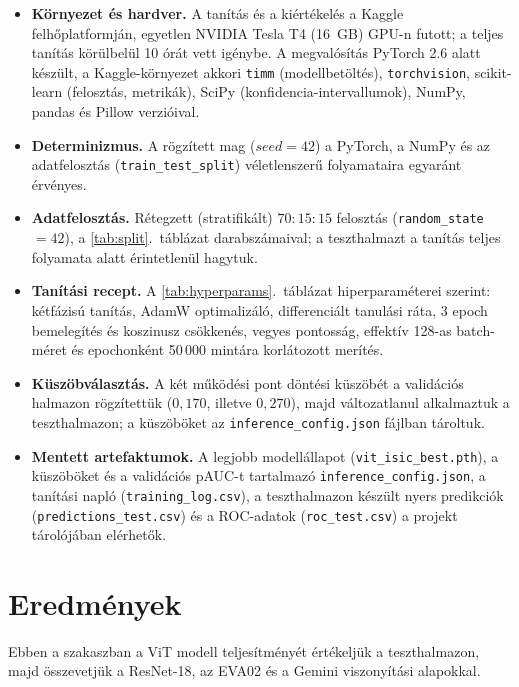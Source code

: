 \begin{itemize}
  \item \textbf{Környezet és hardver.} A tanítás és a kiértékelés a Kaggle
  felhőplatformján, egyetlen NVIDIA Tesla T4 (16~GB) GPU-n futott; a teljes
  tanítás körülbelül 10 órát vett igénybe. A megvalósítás PyTorch 2.6 alatt
  készült, a Kaggle-környezet akkori \texttt{timm} (modellbetöltés),
  \texttt{torchvision}, scikit-learn (felosztás, metrikák), SciPy
  (konfidencia-intervallumok), NumPy, pandas és Pillow verzióival.
  \item \textbf{Determinizmus.} A rögzített mag ($seed = 42$) a PyTorch, a NumPy
  és az adatfelosztás (\texttt{train\_test\_split}) véletlenszerű folyamataira
  egyaránt érvényes.
  \item \textbf{Adatfelosztás.} Rétegzett (stratifikált) $70{:}15{:}15$ felosztás
  (\texttt{random\_state}~$=42$), a \ref{tab:split}.~táblázat darabszámaival; a
  teszthalmazt a tanítás teljes folyamata alatt érintetlenül hagytuk.
  \item \textbf{Tanítási recept.} A \ref{tab:hyperparams}.~táblázat
  hiperparaméterei szerint: kétfázisú tanítás, AdamW optimalizáló, differenciált
  tanulási ráta, 3 epoch bemelegítés és koszinusz csökkenés, vegyes pontosság,
  effektív 128-as batch-méret és epochonként 50\,000 mintára korlátozott merítés.
  \item \textbf{Küszöbválasztás.} A két működési pont döntési küszöbét a
  validációs halmazon rögzítettük ($0{,}170$, illetve $0{,}270$), majd
  változatlanul alkalmaztuk a teszthalmazon; a küszöböket az
  \texttt{inference\_config.json} fájlban tároltuk.
  \item \textbf{Mentett artefaktumok.} A legjobb modellállapot
  (\texttt{vit\_isic\_best.pth}), a küszöböket és a validációs pAUC-t tartalmazó
  \texttt{inference\_config.json}, a tanítási napló (\texttt{training\_log.csv}),
  a teszthalmazon készült nyers predikciók (\texttt{predictions\_test.csv}) és a
  ROC-adatok (\texttt{roc\_test.csv}) a projekt tárolójában elérhetők.
\end{itemize}

\section{Eredmények}

Ebben a szakaszban a ViT modell teljesítményét értékeljük a teszthalmazon, majd
összevetjük a ResNet-18, az EVA02 és a Gemini viszonyítási alapokkal.


